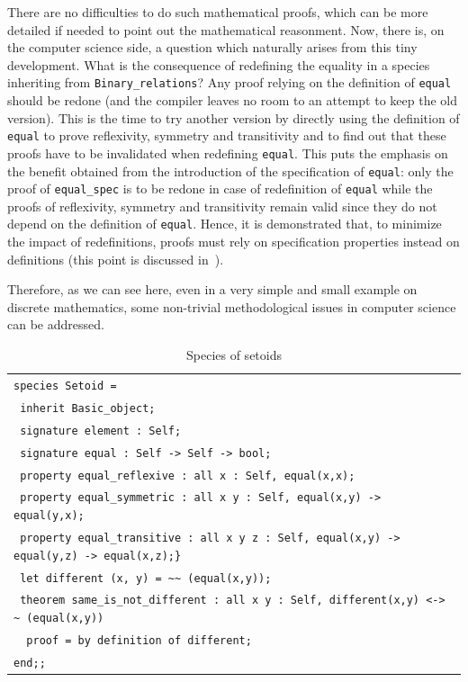 \documentclass[submission,copyright,creativecommons]{eptcs}
\begin{document}
There are no difficulties to do such mathematical proofs, which can
be more detailed if needed to point out the mathematical reasonment. 
Now, there is, on the computer science side,  a question which naturally arises from this tiny
development. What is the consequence of redefining the equality in a
species inheriting from {\footnotesize \tt Binary\_relations}? Any
proof relying on the definition of {\footnotesize \tt equal} should be
redone (and the compiler leaves no room to an attempt to keep the old
version). This is the time to try another version by directly using
the definition of {\footnotesize \tt equal} to prove reflexivity,
symmetry and transitivity and to find out that these proofs have to be
invalidated when redefining  {\footnotesize \tt equal}. This puts the
emphasis on the benefit obtained from the introduction of the
specification of {\footnotesize \tt equal}: only the proof of 
{\footnotesize \tt equal\_spec} is to be redone in case of
redefinition of {\footnotesize \tt equal} while the proofs 
of reflexivity, symmetry and transitivity remain valid since they do
not depend on the definition of {\footnotesize \tt equal}. Hence, it
is demonstrated that,  to minimize the impact of
redefinitions,  proofs must  rely on specification properties instead on
definitions (this point is discussed in~\cite{calc03}). 


Therefore,
as we can see here,
even in a very simple and small example on discrete mathematics, some non-trivial methodological
issues in computer science can be addressed.




\begin{table}
\begin{center}
\begin{scriptsize}
\begin{tabular}{|l|}
\hline
{\verb+species Setoid =+} \\
{\verb+ inherit Basic_object;+} \\
{\verb+ signature element : Self;+}\\
{\verb+ signature equal : Self -> Self -> bool;+} \\
{\verb+ property equal_reflexive : all x : Self, equal(x,x);+}\\
{\verb+ property equal_symmetric : all x y : Self, equal(x,y) -> equal(y,x);+}\\
{\verb+ property equal_transitive : all x y z : Self, equal(x,y) -> equal(y,z) -> equal(x,z);}+}\\
{\verb+ let different (x, y) = ~~ (equal(x,y));+}\\
{\verb+ theorem same_is_not_different : all x y : Self, different(x,y) <-> ~ (equal(x,y))+}\\
{\verb+  proof = by definition of different;+}\\
{\verb+end;;+}\\
\hline
\end{tabular}
\end{scriptsize}
\end{center}
\caption{Species of setoids}\label{spec_setoid}
\end{table}
\end{document}
